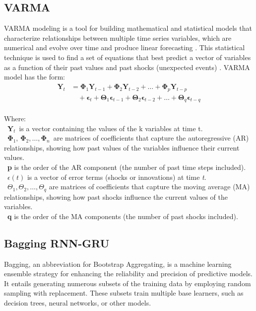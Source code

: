 \documentclass{ieeeojies}
\begin{document}
\subsection{VARMA}
VARMA modeling is a tool for building mathematical and statistical models that characterize relationships between multiple time series variables, which are numerical and evolve over time and produce linear forecasting \cite{b11}. This statistical technique is used to find a set of equations that best predict a vector of variables as a function of their past values and past shocks (unexpected events) \cite{b12}. VARMA model \cite{b13} has the form:
\begin{equation}
\begin{split}
\mathbf{Y}_t &= \mathbf{\Phi}_1 \mathbf{Y}_{t-1} + \mathbf{\Phi}_2 \mathbf{Y}_{t-2} + \dots + \mathbf{\Phi}_p \mathbf{Y}_{t-p} \\
&\quad + \mathbf{\epsilon}_t + \mathbf{\Theta}_1 \mathbf{\epsilon}_{t-1} + \mathbf{\Theta}_2 \mathbf{\epsilon}_{t-2} + \dots + \mathbf{\Theta}_q \mathbf{\epsilon}_{t-q}
\end{split}
\end{equation}
\\
Where: \\ 
         \indent\textbullet\ \(\mathbf{Y}_t\)\ is a vector containing the values of the k variables at time t. \\
         \indent\textbullet\ \(\mathbf{\Phi}_1,\,\mathbf{\Phi}_2, \ldots, \mathbf{\Phi}_n\)\ are matrices of coefficients that capture the autoregressive (AR) relationships, showing how past values of the variables influence their current values. \\
         \indent\textbullet\ \textbf{p} is the order of the AR component (the number of past time steps included). \\
         \indent\textbullet\ \({\epsilon}(t)\) is  a vector of error terms (shocks or innovations) at time \textit{t}. \\
         \indent\textbullet\ \({\Theta}_1, {\Theta}_2, \ldots ,{\Theta}_q\) are matrices of coefficients that capture the moving average (MA) relationships, showing how past shocks influence the current values of the variables. \\
         \indent\textbullet\ \textbf{q} is the order of the MA components (the number of past shocks included). 
\subsection{Bagging RNN-GRU}
Bagging, an abbreviation for Bootstrap Aggregating, is a machine learning ensemble strategy for enhancing the reliability and precision of predictive models. It entails generating numerous subsets of the training data by employing random sampling with replacement. These subsets train multiple base learners, such as decision trees, neural networks, or other models\cite{b14}.
\end{document}
